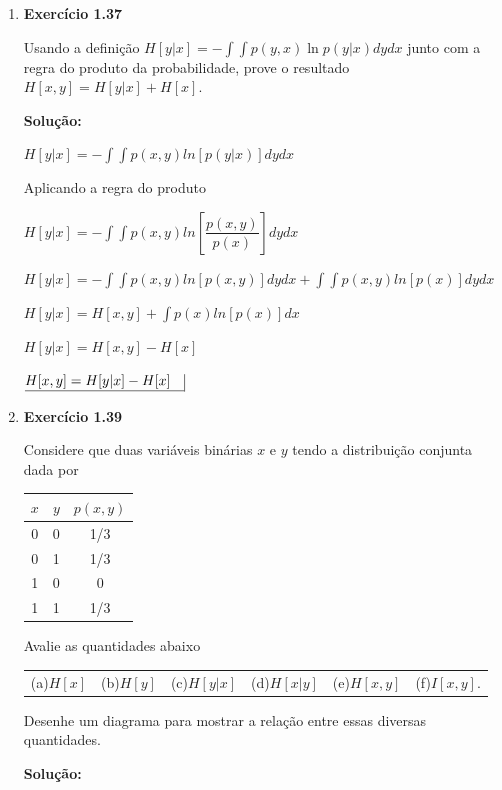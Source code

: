 \begin{enumerate}
\item \textbf{Exercício 1.37} \par

Usando a definição $H[y|x] = - \int \int p(y,x) \ln p(y|x) dy dx$ junto com a regra do produto da probabilidade, prove o resultado $H[x,y] = H[y|x] + H[x]$. 
\newline \par
\textbf{Solução:}

$H[y|x] = \displaystyle - \int \int p(x,y) ln[p(y|x)] dy dx $

Aplicando a regra do produto

$H[y|x] = \displaystyle - \int \int p(x,y) ln\left[\dfrac{p(x,y)}{p(x)}\right] dy dx $

$H[y|x] = \displaystyle - \int \int p(x,y) ln[p(x,y)] dy dx + \int \int p(x,y) ln[p(x)] dy dx$

$H[y|x] = \displaystyle H[x,y] + \int p(x) ln[p(x)] dx$

$H[y|x] = H[x,y] - H[x]$

$\underline{H[x,y] = H[y|x] - H[x] \quad} \vline$

\item \textbf{Exercício 1.39} \par

Considere que duas variáveis binárias $x$ e $y$ tendo a distribuição conjunta dada por
\begin{center}
    \begin{tabular}{|c|c|c|}
    \hline
    $x$ & $y$ & $p(x, y)$ \\
    \hline
    0 & 0 & 1/3\\
    \hline
    0 & 1 & 1/3\\
    \hline
    1 & 0 & 0\\
    \hline
    1 & 1 & 1/3\\
    \hline
    \end{tabular}
\end{center}
Avalie as quantidades abaixo
\begin{center}
    \begin{tabular}{c c c c c c}
     (a)$H[x]$ & (b)$H[y]$ & (c)$H[y|x]$ & (d)$H[x|y]$ & (e)$H[x,y]$ & (f)$I[x,y]$. \\
    \end{tabular}
\end{center}
Desenhe um diagrama para mostrar a relação entre essas diversas quantidades.
\newline \par
\textbf{Solução:}


\end{enumerate}
